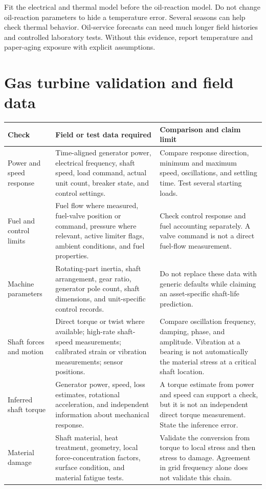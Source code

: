 \documentclass[11pt,a4paper]{report}
\begin{document}
Fit the electrical and thermal model before the oil-reaction model.
Do not change oil-reaction parameters to hide a temperature error.
Several seasons can help check thermal behavior.
Oil-service forecasts can need much longer field histories and controlled laboratory tests.
Without this evidence, report temperature and paper-aging exposure with explicit assumptions.

\section{Gas turbine validation and field data}
\begin{longtable}{L{0.18\textwidth}L{0.35\textwidth}L{0.35\textwidth}}
\toprule Check & Field or test data required & Comparison and claim limit \\ \midrule\endhead
Power and speed response & Time-aligned generator power, electrical frequency, shaft speed, load command, actual unit count, breaker state, and control settings. & Compare response direction, minimum and maximum speed, oscillations, and settling time. Test several starting loads. \\
Fuel and control limits & Fuel flow where measured, fuel-valve position or command, pressure where relevant, active limiter flags, ambient conditions, and fuel properties. & Check control response and fuel accounting separately. A valve command is not a direct fuel-flow measurement. \\
Machine parameters & Rotating-part inertia, shaft arrangement, gear ratio, generator pole count, shaft dimensions, and unit-specific control records. & Do not replace these data with generic defaults while claiming an asset-specific shaft-life prediction. \\
Shaft forces and motion & Direct torque or twist where available; high-rate shaft-speed measurements; calibrated strain or vibration measurements; sensor positions. & Compare oscillation frequency, damping, phase, and amplitude. Vibration at a bearing is not automatically the material stress at a critical shaft location. \\
Inferred shaft torque & Generator power, speed, loss estimates, rotational acceleration, and independent information about mechanical response. & A torque estimate from power and speed can support a check, but it is not an independent direct torque measurement. State the inference error. \\
Material damage & Shaft material, heat treatment, geometry, local force-concentration factors, surface condition, and material fatigue tests. & Validate the conversion from torque to local stress and then stress to damage. Agreement in grid frequency alone does not validate this chain. \\

\end{longtable}
\end{document}
